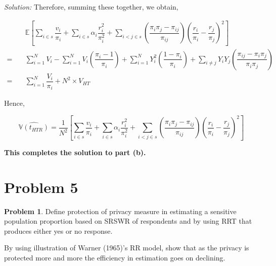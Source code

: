 \documentclass[12pt]{article}
\newcommand{\E}{\mathbb{E}}
\newcommand{\Var}{\mathbb{V}}
\theoremstyle{definition}
\newtheorem*{prb}{Problem}
\newenvironment{problem}{
\begin{tcolorbox}[colback=blue!5!white,colframe=blue!75!black, parbox = true] \begin{prb}  }{\end{prb}\end{tcolorbox} }
\newenvironment{answer}{\textit{Solution: }\quad }{ \hfill \qedsymbol}
\begin{document}
\begin{answer}
	Therefore, summing these together, we obtain,

	\begin{align*}
		& \E\left[ \sum_{i \in s} \dfrac{v_i}{\pi_i} +  \sum_{i \in s} \alpha_i \dfrac{r_i^2}{\pi_i^2} + \sum_{i < j \in s} \left( \dfrac{\pi_i \pi_j - \pi_{ij}}{\pi_{ij}} \right) \left( \dfrac{r_i}{\pi_i} - \dfrac{r_j}{\pi_j} \right)^2 \right]\\
		= \quad & \sum_{i=1}^{N} V_i - \sum_{i=1}^{N} V_i \left( \dfrac{\pi_i - 1}{\pi_i} \right) + \sum_{i = 1}^{N} Y_i^2 \left(\dfrac{1 - \pi_i}{\pi_i}\right) + \sum_{i \neq j} Y_i Y_j \left(\dfrac{\pi_{ij} - \pi_i \pi_j}{\pi_i \pi_j}\right)\\
		= \quad & \sum_{i=1}^{N} \dfrac{V_i}{\pi_i} + N^2 \times V_{HT}
	\end{align*}

	Hence,

	$$\widehat{\Var(t_{HTR})} = \dfrac{1}{N^2} \left[ \sum_{i \in s} \dfrac{v_i}{\pi_i} +  \sum_{i \in s} \alpha_i \dfrac{r_i^2}{\pi_i^2} + \sum_{i < j \in s} \left( \dfrac{\pi_i \pi_j - \pi_{ij}}{\pi_{ij}} \right) \left( \dfrac{r_i}{\pi_i} - \dfrac{r_j}{\pi_j} \right)^2 \right] $$

	\textbf{This completes the solution to part (b).}
	
\end{answer}









\section{Problem 5}

\begin{problem}
	Define protection of privacy measure in estimating a sensitive population proportion based on SRSWR of respondents and by using RRT that produces either yes or no response. 

	By using illustration of Warner (1965)'s RR model, show that as the privacy is protected more and more the efficiency in estimation goes on declining.
\end{problem}
\end{document}
